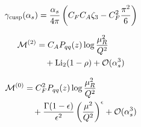 \begin{equation}
  \gamma_{\rm cusp}(\alpha_s) = \frac{\alpha_s}{4\pi} \left( C_F C_A \zeta_{3} - C_F^2 \frac{\pi^2}{6} \right)
  \label{eq:8}
\end{equation}

\begin{align}
  \mathcal{M}^{(2)} &= C_A P_{qq}(z) \log\frac{\mu_R^2}{Q^2} \nonumber \\
  &\quad + \mathrm{Li}_{2}(1 - \rho) + \mathcal{O}(\alpha_s^3) \label{eq:9}
\end{align}

\begin{align}
  \mathcal{M}^{(0)} &= C_F^2 P_{qq}(z) \log\frac{\mu_R^2}{Q^2} \nonumber \\
  &\quad + \frac{\Gamma(1-\epsilon)}{\epsilon^{2}} \left(\frac{\mu^2}{Q^2}\right)^{\epsilon} + \mathcal{O}(\alpha_s^3) \label{eq:10}
\end{align}

